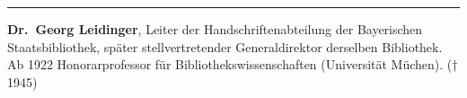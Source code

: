 \begin{center}\rule{0.5\linewidth}{\linethickness}\end{center}

\textbf{Dr.~Georg Leidinger}, Leiter der Handschriftenabteilung der
Bayerischen Staatsbibliothek, später stellvertretender Generaldirektor
derselben Bibliothek. Ab 1922 Honorarprofessor für
Bibliothekswissenschaften (Universität Müchen). († 1945)
